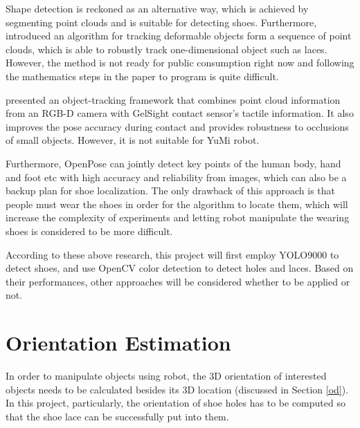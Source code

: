 Shape detection is reckoned as an alternative way, which is achieved by segmenting point clouds and is suitable for detecting shoes. Furthermore, \citep{deformable_track} introduced an algorithm for tracking deformable objects form a sequence of point clouds, which is able to robustly track one-dimensional object such as laces. However, the method is not ready for public consumption right now and following the mathematics steps in the paper to program is quite difficult. 

\citep{vision_touch} presented an object-tracking framework that combines point cloud information from an RGB-D camera with GelSight contact sensor's tactile information. It also improves the pose accuracy during contact and provides robustness to occlusions of small objects. However, it is not suitable for YuMi robot.

Furthermore, OpenPose \citep{openpose} can jointly detect key points of the human body, hand and foot etc with high accuracy and reliability from images, which can also be a backup plan for shoe localization. The only drawback of this approach is that people must wear the shoes in order for the algorithm to locate them, which will increase the complexity of experiments and letting robot manipulate the wearing shoes is considered to be more difficult.

According to these above research, this project will first employ YOLO9000 to detect shoes, and use OpenCV color detection to detect holes and laces. Based on their performances, other approaches will be considered whether to be applied or not.

\section{Orientation Estimation} \label{oriestimation}
In order to manipulate objects using robot, the 3D orientation of interested objects needs to be calculated besides its 3D location (discussed in Section \ref{od}). In this project, particularly, the orientation of shoe holes has to be computed so that the shoe lace can be successfully put into them.

